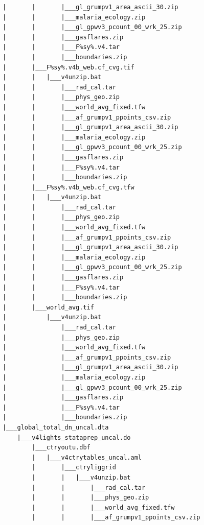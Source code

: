 \documentclass[]{book}
\begin{document}
\begin{verbatim}
            |       |       |___gl_grumpv1_area_ascii_30.zip
            |       |       |___malaria_ecology.zip
            |       |       |___gl_gpwv3_pcount_00_wrk_25.zip
            |       |       |___gasflares.zip
            |       |       |___F%sy%.v4.tar
            |       |       |___boundaries.zip
            |       |___F%sy%.v4b_web.cf_cvg.tif
            |       |   |___v4unzip.bat
            |       |       |___rad_cal.tar
            |       |       |___phys_geo.zip
            |       |       |___world_avg_fixed.tfw
            |       |       |___af_grumpv1_ppoints_csv.zip
            |       |       |___gl_grumpv1_area_ascii_30.zip
            |       |       |___malaria_ecology.zip
            |       |       |___gl_gpwv3_pcount_00_wrk_25.zip
            |       |       |___gasflares.zip
            |       |       |___F%sy%.v4.tar
            |       |       |___boundaries.zip
            |       |___F%sy%.v4b_web.cf_cvg.tfw
            |       |   |___v4unzip.bat
            |       |       |___rad_cal.tar
            |       |       |___phys_geo.zip
            |       |       |___world_avg_fixed.tfw
            |       |       |___af_grumpv1_ppoints_csv.zip
            |       |       |___gl_grumpv1_area_ascii_30.zip
            |       |       |___malaria_ecology.zip
            |       |       |___gl_gpwv3_pcount_00_wrk_25.zip
            |       |       |___gasflares.zip
            |       |       |___F%sy%.v4.tar
            |       |       |___boundaries.zip
            |       |___world_avg.tif
            |           |___v4unzip.bat
            |               |___rad_cal.tar
            |               |___phys_geo.zip
            |               |___world_avg_fixed.tfw
            |               |___af_grumpv1_ppoints_csv.zip
            |               |___gl_grumpv1_area_ascii_30.zip
            |               |___malaria_ecology.zip
            |               |___gl_gpwv3_pcount_00_wrk_25.zip
            |               |___gasflares.zip
            |               |___F%sy%.v4.tar
            |               |___boundaries.zip
            |___global_total_dn_uncal.dta
                |___v4lights_stataprep_uncal.do
                    |___ctryoutu.dbf
                    |   |___v4ctrytables_uncal.aml
                    |       |___ctryliggrid
                    |       |   |___v4unzip.bat
                    |       |       |___rad_cal.tar
                    |       |       |___phys_geo.zip
                    |       |       |___world_avg_fixed.tfw
                    |       |       |___af_grumpv1_ppoints_csv.zip

\end{verbatim}
\end{document}
